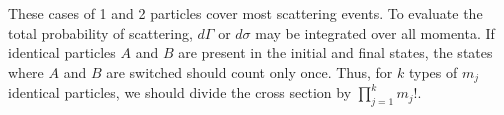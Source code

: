These cases of 1 and 2 particles cover most scattering events. To evaluate the total probability of scattering, $d\Gamma$ or $d\sigma$ may be integrated over all momenta. If identical particles $A$ and $B$ are present in the initial and final states, the states where $A$ and $B$ are switched should count only once. Thus, for $k$ types of $m_j$ identical particles, we should divide the cross section by $\prod_{j=1}^k m_j!$.

